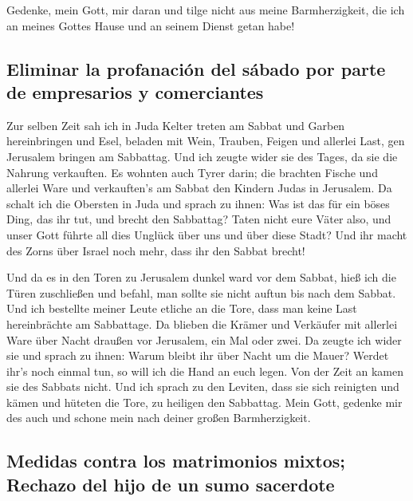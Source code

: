  Gedenke, mein Gott, mir daran und tilge nicht aus meine
Barmherzigkeit, die ich an meines Gottes Hause und an seinem Dienst
getan habe!

\hypertarget{eliminar-la-profanaciuxf3n-del-suxe1bado-por-parte-de-empresarios-y-comerciantes}{%
\subsection{Eliminar la profanación del sábado por parte de empresarios
y
comerciantes}\label{eliminar-la-profanaciuxf3n-del-suxe1bado-por-parte-de-empresarios-y-comerciantes}}

 Zur selben Zeit sah ich in Juda Kelter treten am Sabbat
und Garben hereinbringen und Esel, beladen mit Wein, Trauben, Feigen und
allerlei Last, gen Jerusalem bringen am Sabbattag. Und ich zeugte wider
sie des Tages, da sie die Nahrung verkauften.  Es wohnten
auch Tyrer darin; die brachten Fische und allerlei Ware und verkauften's
am Sabbat den Kindern Judas in Jerusalem.  Da schalt ich
die Obersten in Juda und sprach zu ihnen: Was ist das für ein böses
Ding, das ihr tut, und brecht den Sabbattag?  Taten nicht
eure Väter also, und unser Gott führte all dies Unglück über uns und
über diese Stadt? Und ihr macht des Zorns über Israel noch mehr, dass
ihr den Sabbat brecht!

 Und da es in den Toren zu Jerusalem dunkel ward vor dem
Sabbat, hieß ich die Türen zuschließen und befahl, man sollte sie nicht
auftun bis nach dem Sabbat. Und ich bestellte meiner Leute etliche an
die Tore, dass man keine Last hereinbrächte am Sabbattage.
 Da blieben die Krämer und Verkäufer mit allerlei Ware
über Nacht draußen vor Jerusalem, ein Mal oder zwei.  Da
zeugte ich wider sie und sprach zu ihnen: Warum bleibt ihr über Nacht um
die Mauer? Werdet ihr's noch einmal tun, so will ich die Hand an euch
legen. Von der Zeit an kamen sie des Sabbats nicht.  Und
ich sprach zu den Leviten, dass sie sich reinigten und kämen und hüteten
die Tore, zu heiligen den Sabbattag. Mein Gott, gedenke mir des auch und
schone mein nach deiner großen Barmherzigkeit.

\hypertarget{medidas-contra-los-matrimonios-mixtos-rechazo-del-hijo-de-un-sumo-sacerdote}{%
\subsection{Medidas contra los matrimonios mixtos; Rechazo del hijo de
un sumo
sacerdote}\label{medidas-contra-los-matrimonios-mixtos-rechazo-del-hijo-de-un-sumo-sacerdote}}


